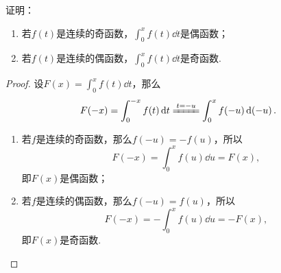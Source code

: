 \begin{example}
证明：\begin{enumerate}
	\item 若\(f(t)\)是连续的奇函数，\(\int_0^x f(t) \dd{t}\)是偶函数；
	\item 若\(f(t)\)是连续的偶函数，\(\int_0^x f(t) \dd{t}\)是奇函数.
\end{enumerate}
\begin{proof}
设\(F(x) = \int_0^x f(t) \dd{t}\)，那么\[
F(-x) = \int_0^{-x} f(t) \dd{t}
\xlongequal{t=-u} \int_0^x f(-u) \dd(-u).
\]
\begin{enumerate}
\item 若\(f\)是连续的奇函数，那么\(f(-u) = -f(u)\)，所以\[
F(-x) = \int_0^x f(u) \dd{u} = F(x),
\]即\(F(x)\)是偶函数；

\item 若\(f\)是连续的偶函数，那么\(f(-u) = f(u)\)，所以\[
F(-x) = -\int_0^x f(u) \dd{u} = -F(x),
\]即\(F(x)\)是奇函数.
\qedhere
\end{enumerate}
\end{proof}
\end{example}
